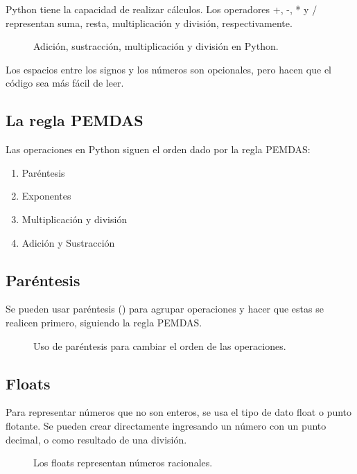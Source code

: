 \documentclass{article}
\begin{document}
Python tiene la capacidad de realizar cálculos. Los operadores +, -, * y / representan suma, resta, multiplicación y división, respectivamente.

\begin{figure*}[ht!]
  \caption{Adición, sustracción, multiplicación y división en Python.}
\end{figure*}

Los espacios entre los signos y los números son opcionales, pero hacen que el código sea más fácil de leer.

\subsection{La regla PEMDAS}

Las operaciones en Python siguen el orden dado por la regla PEMDAS:

\begin{enumerate}
  \item Paréntesis
  \item Exponentes
  \item Multiplicación y división
  \item Adición y Sustracción
\end{enumerate}


\subsection{Paréntesis}

Se pueden usar paréntesis () para agrupar operaciones y hacer que estas se realicen primero, siguiendo la regla PEMDAS.

\begin{figure*}[ht!]
  \caption{Uso de paréntesis para cambiar el orden de las operaciones.}
\end{figure*}

\subsection{Floats}
    
Para representar números que no son enteros, se usa el tipo de dato float o punto flotante. Se pueden crear directamente ingresando un número con un punto decimal, o como resultado de una división.

\begin{figure*}[ht!]
  \caption{Los floats representan números racionales.}
\end{figure*}
\end{document}
